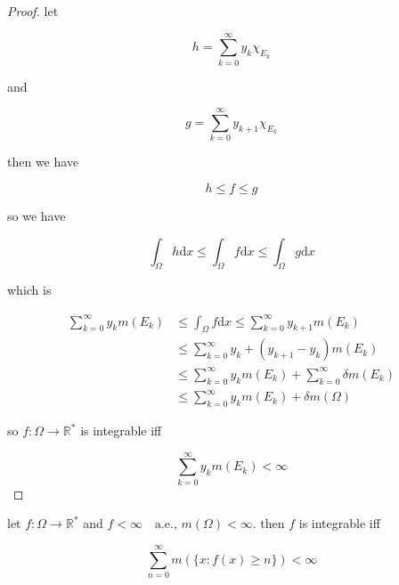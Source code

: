 \documentclass[11pt,a4paper]{article}
\begin{document}
\begin{proof}
    let 

    \[
        h = \sum_{k=0}^{\infty} y_k \chi_{E_k}
    \]

    and

    \[
        g = \sum_{k=0}^{\infty} y_{k+1} \chi_{E_k}
    \]

    then we have

    \[
        h \le f \le g
    \]

    so we have

    \[
     \int_{\Omega}h \mathrm{d}x  \le  \int_{\Omega}f \mathrm{d}x \le \int_{\Omega}g \mathrm{d}x
    \]

    which is

    \begin{align*}
        \sum_{k=0}^{\infty}y_k m(E_k) &\le \int_{\Omega}f \mathrm{d}x \le \sum_{k=0}^{\infty}y_{k+1} m(E_k) \\
            & \le \sum_{k=0}^{\infty}y_{k} + (y_{k+1} - y_k) m(E_k) \\
            & \le \sum_{k=0}^{\infty}y_{k}m(E_k) + \sum_{k=0}^{\infty}\delta m(E_k) \\
            & \le \sum_{k=0}^{\infty}y_{k}m(E_k) + \delta m(\Omega)
    \end{align*}

    so $f: \Omega \to \mathbb{R}^*$ is integrable iff 

    \[
        \sum_{k=0}^{\infty}y_k m(E_k) < \infty
    \]

\end{proof}


\begin{exercise}
    let $f: \Omega \to \mathbb{R}^*$ and $f < \infty \quad \text{a.e.},\, m(\Omega) < \infty$. 
    then $f$ is integrable iff

    \[
        \sum_{n=0}^{\infty}m(\{ x: f(x) \ge n \}) < \infty
    \]

\end{exercise}
\end{document}

